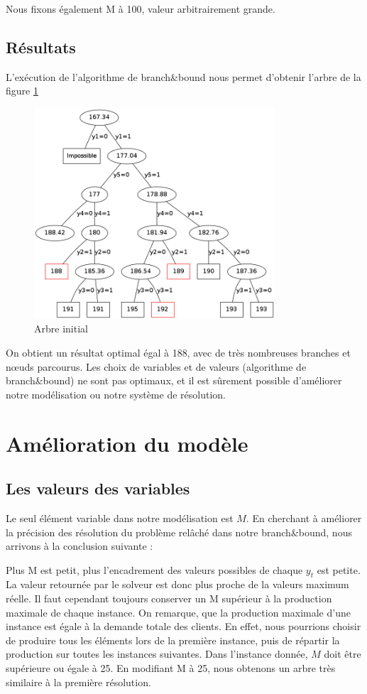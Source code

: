 \documentclass[a4paper,11pt,twoside]{report}
\begin{document}
 Nous fixons également M à 100, valeur arbitrairement grande.
\section{Résultats}
L'exécution de l'algorithme de branch\&bound nous permet d'obtenir l'arbre de la figure \ref{graph1}
\begin{figure}[h]
 \centering
 \includegraphics[width=0.8\textwidth]{graph1.png}
 \caption{Arbre initial}
 \label{graph1}
\end{figure}

On obtient un résultat optimal égal à 188, avec de très nombreuses branches et n\oe{}uds parcourus. Les choix de variables et de valeurs (algorithme de branch\&bound) ne sont pas optimaux, et il est sûrement possible d'améliorer notre modélisation ou notre système de résolution.
\chapter{Amélioration du modèle}
\section{Les valeurs des variables}
Le seul élément variable dans notre modélisation est $M$. En cherchant à améliorer la précision des résolution du problème relâché dans notre branch\&bound, nous arrivons à la conclusion suivante :

Plus M est petit, plus l'encadrement des valeurs possibles de chaque $y_t$ est petite. La valeur retournée par le solveur est donc plus proche de la valeurs maximum réelle.
Il faut cependant toujours conserver un M supérieur à la production maximale de chaque instance. On remarque, que la production maximale d'une instance est égale à la demande totale des clients. En effet, nous pourrions choisir de produire tous les éléments lors de la première instance, puis de répartir la production sur toutes les instances suivantes.
Dans l'instance donnée, $M$ doit être supérieure ou égale à 25. En modifiant M à 25, nous obtenons un arbre très similaire à la première résolution.
\end{document}
